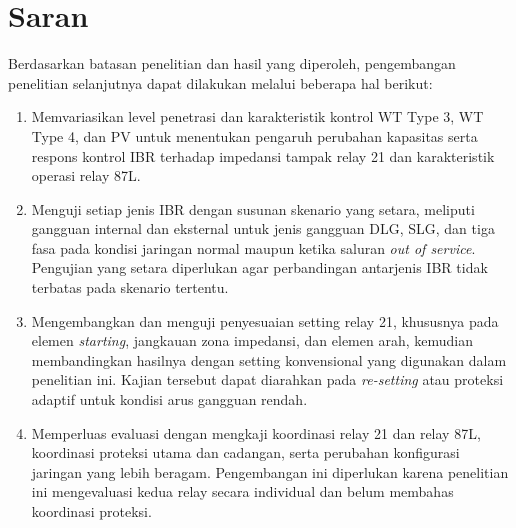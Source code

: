 \section{Saran}

Berdasarkan batasan penelitian dan hasil yang diperoleh, pengembangan penelitian selanjutnya dapat dilakukan melalui beberapa hal berikut:

\begin{enumerate}
	\item Memvariasikan level penetrasi dan karakteristik kontrol WT Type 3, WT Type 4, dan PV untuk menentukan pengaruh perubahan kapasitas serta respons kontrol IBR terhadap impedansi tampak relay 21 dan karakteristik operasi relay 87L.

	\item Menguji setiap jenis IBR dengan susunan skenario yang setara, meliputi gangguan internal dan eksternal untuk jenis gangguan DLG, SLG, dan tiga fasa pada kondisi jaringan normal maupun ketika saluran \textit{out of service}. Pengujian yang setara diperlukan agar perbandingan antarjenis IBR tidak terbatas pada skenario tertentu.

	\item Mengembangkan dan menguji penyesuaian setting relay 21, khususnya pada elemen \textit{starting}, jangkauan zona impedansi, dan elemen arah, kemudian membandingkan hasilnya dengan setting konvensional yang digunakan dalam penelitian ini. Kajian tersebut dapat diarahkan pada \textit{re-setting} atau proteksi adaptif untuk kondisi arus gangguan rendah.

	\item Memperluas evaluasi dengan mengkaji koordinasi relay 21 dan relay 87L, koordinasi proteksi utama dan cadangan, serta perubahan konfigurasi jaringan yang lebih beragam. Pengembangan ini diperlukan karena penelitian ini mengevaluasi kedua relay secara individual dan belum membahas koordinasi proteksi.
\end{enumerate}
